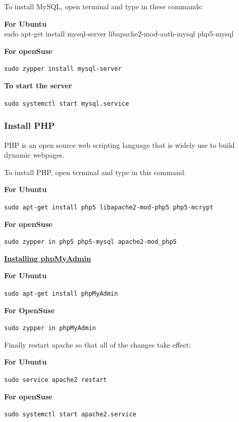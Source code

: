 \documentclass[16pt]{article}
\begin{document}
  To install MySQL, open terminal and type in these commands:

  \textbf{For Ubuntu} \\ sudo apt-get install mysql-server
  libapache2-mod-auth-mysql php5-mysql

  \textbf{For openSuse}

  \texttt{sudo zypper install mysql-server}

  \textbf{To start the server}

  \texttt{sudo systemctl start mysql.service}
  
   \vspace{1cm}

  \subsubsection{Install PHP}
   \vspace{0.5cm}

  PHP is an open source web scripting language that is widely use to build
  dynamic webpages.

  To install PHP, open terminal and type in this command.

  \textbf{For Ubuntu}

  \texttt{sudo apt-get install php5 libapache2-mod-php5 php5-mcrypt}

  \textbf{For openSuse}

  \texttt{sudo zypper in php5 php5-mysql apache2-mod\_php5}
  
   \vspace{0.5cm}

  {\underline{\textbf{Installing phpMyAdmin}}}

  \textbf{For Ubuntu}

  \texttt{sudo apt-get install phpMyAdmin}

  \textbf{For OpenSuse}

  \texttt{sudo zypper in phpMyAdmin}
   \vspace{0.5cm}

  Finally restart apache so that all of the changes take effect:

  \textbf{For Ubuntu}

  \texttt{sudo service apache2 restart}

  \textbf{For openSuse}

  \texttt{sudo systemctl start apache2.service}
   \vspace{0.5cm}

 

  
\end{document}
